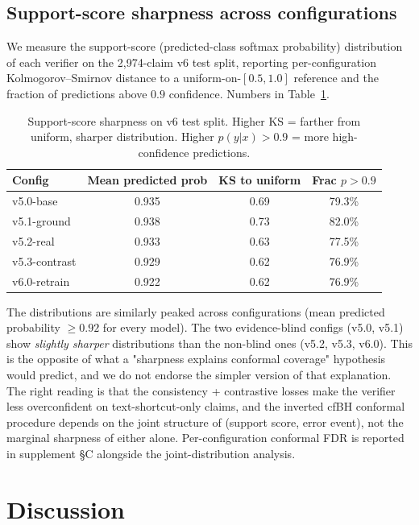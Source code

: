 \documentclass[pmlr]{jmlr}
\begin{document}
\subsection{Support-score sharpness across configurations}
\label{sec:support-sharpness}

We measure the support-score (predicted-class softmax probability) distribution of each verifier on the 2{,}974-claim v6 test split, reporting per-configuration Kolmogorov–Smirnov distance to a uniform-on-$[0.5, 1.0]$ reference and the fraction of predictions above $0.9$ confidence. Numbers in Table~\ref{tab:support-sharpness}.

\begin{table}[t]
\centering
\small
\caption{Support-score sharpness on v6 test split. Higher KS = farther from uniform, sharper distribution. Higher $p(y|x) > 0.9$ = more high-confidence predictions.}
\label{tab:support-sharpness}
\begin{tabular}{lccc}
\toprule
\textbf{Config} & \textbf{Mean predicted prob} & \textbf{KS to uniform} & \textbf{Frac $p > 0.9$} \\
\midrule
v5.0-base       & 0.935 & 0.69 & 79.3\% \\
v5.1-ground     & 0.938 & 0.73 & 82.0\% \\
v5.2-real       & 0.933 & 0.63 & 77.5\% \\
v5.3-contrast   & 0.929 & 0.62 & 76.9\% \\
v6.0-retrain    & 0.922 & 0.62 & 76.9\% \\
\bottomrule
\end{tabular}
\end{table}

The distributions are similarly peaked across configurations (mean predicted probability $\geq 0.92$ for every model). The two evidence-blind configs (v5.0, v5.1) show \emph{slightly sharper} distributions than the non-blind ones (v5.2, v5.3, v6.0). This is the opposite of what a "sharpness explains conformal coverage" hypothesis would predict, and we do not endorse the simpler version of that explanation. The right reading is that the consistency + contrastive losses make the verifier less overconfident on text-shortcut-only claims, and the inverted cfBH conformal procedure depends on the joint structure of (support score, error event), not the marginal sharpness of either alone. Per-configuration conformal FDR is reported in supplement §C alongside the joint-distribution analysis.

\section{Discussion}
\end{document}
